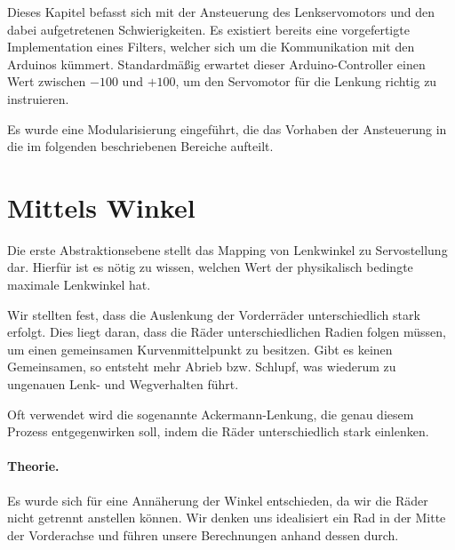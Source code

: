 \documentclass[a4paper,12pt]{report}
\begin{document}
	Dieses Kapitel befasst sich mit der Ansteuerung des Lenkservomotors und den dabei aufgetretenen Schwierigkeiten.
	Es existiert bereits eine vorgefertigte Implementation eines Filters, welcher sich um die Kommunikation mit den Arduinos kümmert.
	Standardmäßig erwartet dieser Arduino-Controller einen Wert zwischen $-100$ und $+100$, um den Servomotor für die Lenkung richtig zu instruieren.

	Es wurde eine Modularisierung eingeführt, die das Vorhaben der Ansteuerung in die im folgenden beschriebenen Bereiche aufteilt.

\section{Mittels Winkel}
\label{Steering-Angle-To-Servo}

	Die erste Abstraktionsebene stellt das Mapping von Lenkwinkel zu Servostellung dar.
	Hierfür ist es nötig zu wissen, welchen Wert der physikalisch bedingte maximale Lenkwinkel hat.

	Wir stellten fest, dass die Auslenkung der Vorderräder unterschiedlich stark erfolgt.
	Dies liegt daran, dass die Räder unterschiedlichen Radien folgen müssen, um einen gemeinsamen Kurvenmittelpunkt zu besitzen.
	Gibt es keinen Gemeinsamen, so entsteht mehr Abrieb bzw. Schlupf, was wiederum zu ungenauen Lenk- und Wegverhalten führt.

	Oft verwendet wird die sogenannte Ackermann-Lenkung, die genau diesem Prozess entgegenwirken soll, indem die Räder unterschiedlich stark einlenken.

	\paragraph{Theorie.}
	Es wurde sich für eine Annäherung der Winkel entschieden, da wir die Räder nicht getrennt anstellen können.
	Wir denken uns idealisiert ein Rad in der Mitte der Vorderachse und führen unsere Berechnungen anhand dessen durch.
\end{document}
